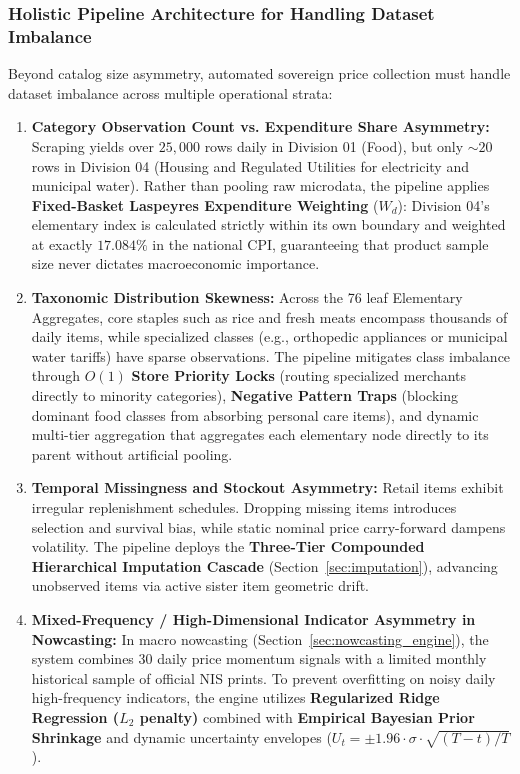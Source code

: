 \subsubsection{Holistic Pipeline Architecture for Handling Dataset Imbalance}
\hs Beyond catalog size asymmetry, automated sovereign price collection must handle dataset imbalance across multiple operational strata:
\begin{enumerate}
    \item \textbf{Category Observation Count vs. Expenditure Share Asymmetry:} Scraping yields over $25,000$ rows daily in Division 01 (Food), but only $\sim 20$ rows in Division 04 (Housing and Regulated Utilities for electricity and municipal water). Rather than pooling raw microdata, the pipeline applies \textbf{Fixed-Basket Laspeyres Expenditure Weighting} ($W_d$): Division 04's elementary index is calculated strictly within its own boundary and weighted at exactly $17.084\%$ in the national CPI, guaranteeing that product sample size never dictates macroeconomic importance.
    \item \textbf{Taxonomic Distribution Skewness:} Across the 76 leaf Elementary Aggregates, core staples such as rice and fresh meats encompass thousands of daily items, while specialized classes (e.g., orthopedic appliances or municipal water tariffs) have sparse observations. The pipeline mitigates class imbalance through $O(1)$ \textbf{Store Priority Locks} (routing specialized merchants directly to minority categories), \textbf{Negative Pattern Traps} (blocking dominant food classes from absorbing personal care items), and dynamic multi-tier aggregation that aggregates each elementary node directly to its parent without artificial pooling.
    \item \textbf{Temporal Missingness and Stockout Asymmetry:} Retail items exhibit irregular replenishment schedules. Dropping missing items introduces selection and survival bias, while static nominal price carry-forward dampens volatility. The pipeline deploys the \textbf{Three-Tier Compounded Hierarchical Imputation Cascade} (Section~\ref{sec:imputation}), advancing unobserved items via active sister item geometric drift.
    \item \textbf{Mixed-Frequency / High-Dimensional Indicator Asymmetry in Nowcasting:} In macro nowcasting (Section~\ref{sec:nowcasting_engine}), the system combines 30 daily price momentum signals with a limited monthly historical sample of official NIS prints. To prevent overfitting on noisy daily high-frequency indicators, the engine utilizes \textbf{Regularized Ridge Regression ($L_2$ penalty)} combined with \textbf{Empirical Bayesian Prior Shrinkage} and dynamic uncertainty envelopes ($U_t = \pm 1.96 \cdot \sigma \cdot \sqrt{(T-t)/T}$).
\end{enumerate}

